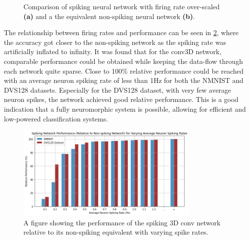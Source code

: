 \begin{figure}[htb]%
    \centering
    \qquad
    \caption{Comparison of spiking neural network with firing rate over-scaled \textbf{(a)} and a the equivalent non-spiking neural network \textbf{(b)}.}%
    \label{fig:over_scaling_firing_rate}%
\end{figure}

The relationship between firing rates and performance can be seen in \cref{fig:spiking_perfromace_with_varying_spike_rate}, where the accuracy got closer to the non-spiking network as the spiking rate was artificially inflated to infinity. It was found that for the conv3D network, comparable performance could be obtained while keeping the data-flow through each network quite sparse. Close to 100\% relative performance could be reached with an average neuron spiking rate of less than 1Hz for both the NMNIST and DVS128 datasets. Especially for the DVS128 dataset, with very few average neuron spikes, the network achieved good relative performance. This is a good indication that a fully neuromorphic system is possible, allowing for efficient and low-powered classification systems.

\begin{figure}[htb]
    \centering
    \includegraphics[width=0.8\textwidth]{testingandresults/images/spiking_perfromace_with_varying_spike_rate.png}
    \caption{A figure showing the performance of the spiking 3D conv network relative to its non-spiking equivalent with varying spike rates.}
    \label{fig:spiking_perfromace_with_varying_spike_rate}
\end{figure}

